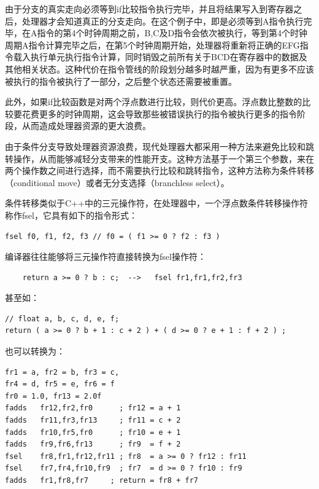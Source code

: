 由于分支的真实走向必须等到if比较指令执行完毕，并且将结果写入到寄存器之后，处理器才会知道真正的分支走向。在这个例子中，即是必须等到A指令执行完毕，在A指令的第4个时钟周期之前，B,C及D指令会依次被执行，等到第4个时钟周期A指令计算完毕之后，在第5个时钟周期开始，处理器将重新将正确的EFG指令载入执行单元执行指令计算，同时销毁之前所有关于BCD在寄存器中的数据及其他相关状态。这种代价在指令管线的阶段划分越多时越严重，因为有更多不应该被执行的指令被执行了一部分，之后整个状态还需要被重置。

此外，如果if比较函数是对两个浮点数进行比较，则代价更高。浮点数比整数的比较要花费更多的时钟周期，这会导致那些被错误执行的指令被执行更多的指令阶段，从而造成处理器资源的更大浪费。

由于条件分支导致处理器资源浪费，现代处理器大都采用一种方法来避免比较和跳转操作，从而能够减轻分支带来的性能开支。这种方法基于一个第三个参数，来在两个操作数之间进行选择，而不需要执行比较和跳转指令，这种方法称为条件转移（conditional move）或者无分支选择（branchless select）。

条件转移类似于C++中的三元操作符，在处理器中，一个浮点数条件转移操作符称作fsel，它具有如下的指令形式：

\begin{lstlisting}
fsel f0, f1, f2, f3 // f0 = ( f1 >= 0 ? f2 : f3 )
\end{lstlisting}

编译器往往能够将三元操作符直接转换为fsel操作符：

\begin{lstlisting}
	return a >= 0 ? b : c;	-->   fsel fr1,fr1,fr2,fr3
\end{lstlisting}

甚至如：

\begin{lstlisting}
// float a, b, c, d, e, f;
return ( a >= 0 ? b + 1 : c + 2 ) + ( d >= 0 ? e + 1 : f + 2 ) ;
\end{lstlisting}
也可以转换为：

\begin{lstlisting}
fr1 = a, fr2 = b, fr3 = c,
fr4 = d, fr5 = e, fr6 = f
fr0 = 1.0, fr13 = 2.0f
fadds   fr12,fr2,fr0      ; fr12 = a + 1
fadds   fr11,fr3,fr13     ; fr11 = c + 2
fadds   fr10,fr5,fr0      ; fr10 = e + 1
fadds   fr9,fr6,fr13      ; fr9  = f + 2
fsel    fr8,fr1,fr12,fr11 ; fr8  = a >= 0 ? fr12 : fr11
fsel    fr7,fr4,fr10,fr9  ; fr7  = d >= 0 ? fr10 : fr9
fadds   fr1,fr8,fr7     ; return = fr8 + fr7
\end{lstlisting}

